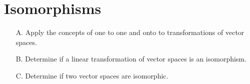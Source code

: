 \section{Isomorphisms}

\begin{outcome}
\begin{enumerate}
\item[A.] Apply the concepts of one to one and onto to transformations of vector spaces. 

\item[B.] Determine if a linear transformation of vector spaces is an isomorphism.

\item[C.] Determine if two vector spaces are isomorphic. 
\end{enumerate}
\end{outcome}